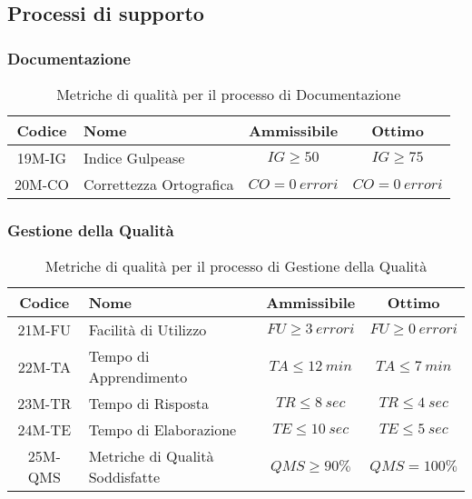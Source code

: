 \newpage
\subsection{Processi di supporto}
\subsubsection{Documentazione}
\begin{table}[h!]
	\centering
	\begin{tabular}{ | c | l | c | c | }
		\hline
		Codice   & Nome                    & Ammissibile        & Ottimo             \\
		\hline
		19M-IG   & Indice Gulpease         & $IG \geq 50$       & $IG \geq 75$       \\
		20M-CO   & Correttezza Ortografica & $CO = 0\ errori$   & $CO = 0\ errori$   \\
		\hline
	\end{tabular}
	\caption{Metriche di qualità per il processo di Documentazione}
\end{table}

\subsubsection{Gestione della Qualità}
\begin{table}[h!]
	\centering
	\begin{tabular}{ | c | l | c | c | }
		\hline
		Codice   & Nome                           & Ammissibile         & Ottimo              \\
		\hline
		21M-FU  & Facilità di Utilizzo            & $FU \geq 3\ errori$ & $FU \geq 0\ errori$ \\
		22M-TA  & Tempo di Apprendimento	      & $TA \leq 12\ min$   & $TA \leq 7\ min$    \\
		23M-TR  & Tempo di Risposta		          & $TR \leq 8\ sec$    & $TR \leq 4\ sec$    \\
		24M-TE  & Tempo di Elaborazione		      & $TE \leq 10\ sec$   & $TE \leq 5\ sec$    \\
		25M-QMS & Metriche di Qualità Soddisfatte & $QMS \geq 90\%$     & $QMS = 100\%$       \\
		\hline
	\end{tabular}
	\caption{Metriche di qualità per il processo di Gestione della Qualità}
\end{table}

